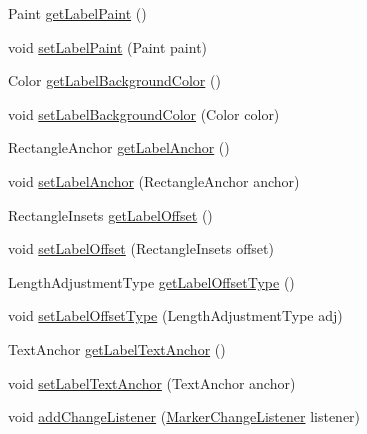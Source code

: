 \begin{DoxyCompactItemize}
\item 
Paint \mbox{\hyperlink{classorg_1_1jfree_1_1chart_1_1plot_1_1_marker_a25ff6c724ed30da3b8997d2bbca8ed25}{get\+Label\+Paint}} ()
\item 
void \mbox{\hyperlink{classorg_1_1jfree_1_1chart_1_1plot_1_1_marker_aa2076c2fb29d173c8484f736851e6a68}{set\+Label\+Paint}} (Paint paint)
\item 
Color \mbox{\hyperlink{classorg_1_1jfree_1_1chart_1_1plot_1_1_marker_a98fd3a2dd65ad47d2d8d6ee3142cb2cc}{get\+Label\+Background\+Color}} ()
\item 
void \mbox{\hyperlink{classorg_1_1jfree_1_1chart_1_1plot_1_1_marker_a31d6677e1d6ae48196891fe2b8b2a2db}{set\+Label\+Background\+Color}} (Color color)
\item 
Rectangle\+Anchor \mbox{\hyperlink{classorg_1_1jfree_1_1chart_1_1plot_1_1_marker_a597f1b7b60843de8f4b75ec8fc28f086}{get\+Label\+Anchor}} ()
\item 
void \mbox{\hyperlink{classorg_1_1jfree_1_1chart_1_1plot_1_1_marker_a999115c5675ccdc061311b8f9906c0ac}{set\+Label\+Anchor}} (Rectangle\+Anchor anchor)
\item 
Rectangle\+Insets \mbox{\hyperlink{classorg_1_1jfree_1_1chart_1_1plot_1_1_marker_afeb7667415110c87d2ab08965dc56bc9}{get\+Label\+Offset}} ()
\item 
void \mbox{\hyperlink{classorg_1_1jfree_1_1chart_1_1plot_1_1_marker_a38b7f54bed2200e77aac141fa1fd3980}{set\+Label\+Offset}} (Rectangle\+Insets offset)
\item 
Length\+Adjustment\+Type \mbox{\hyperlink{classorg_1_1jfree_1_1chart_1_1plot_1_1_marker_aac843d9d59a3fb72e8043bd82eacf86c}{get\+Label\+Offset\+Type}} ()
\item 
void \mbox{\hyperlink{classorg_1_1jfree_1_1chart_1_1plot_1_1_marker_a587b510f9d7c24e7761992863f97a6bf}{set\+Label\+Offset\+Type}} (Length\+Adjustment\+Type adj)
\item 
Text\+Anchor \mbox{\hyperlink{classorg_1_1jfree_1_1chart_1_1plot_1_1_marker_a24f2b2bcafa9ccc520dd4c52c074e985}{get\+Label\+Text\+Anchor}} ()
\item 
void \mbox{\hyperlink{classorg_1_1jfree_1_1chart_1_1plot_1_1_marker_a32c1fda6586338971917109d3a8684cf}{set\+Label\+Text\+Anchor}} (Text\+Anchor anchor)
\item 
void \mbox{\hyperlink{classorg_1_1jfree_1_1chart_1_1plot_1_1_marker_a8e820405ec8c80e7c4f4a4189823732d}{add\+Change\+Listener}} (\mbox{\hyperlink{interfaceorg_1_1jfree_1_1chart_1_1event_1_1_marker_change_listener}{Marker\+Change\+Listener}} listener)

\end{DoxyCompactItemize}
